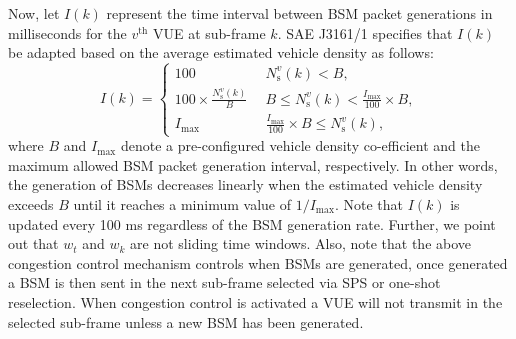 \documentclass[conference]{IEEEtran}
\begin{document}
Now, let $I(k)$ represent the time interval between BSM packet generations in milliseconds for the $v^{\mathrm{th}}$ VUE at sub-frame $k$. SAE J3161/1 specifies that $I(k)$ be adapted based on the average estimated vehicle density as follows:   
\begin{equation}
        I(k)=
        \begin{cases}
            100 & \,\,\,N_{\mathrm{s}}^{v}(k) < B,\\
            100\times\frac{{N_{\mathrm{s}}^{v}(k)}}{B} & \,\,\,B \leq{N_{\mathrm{s}}^{v}(k)}<\frac{I_{\mathrm{max}}}{100}\times{B},\\
            I_{\mathrm{max}} &\,\,\, \frac{I_{\mathrm{max}}}{100}\times{B}\leq{N_{\mathrm{s}}^{v}(k)},
        \end{cases}
\end{equation}
where $B$ and $I_{\mathrm{max}}$ denote a pre-configured vehicle density co-efficient and the maximum allowed BSM packet generation interval, respectively. In other words, the generation of BSMs decreases linearly when the estimated vehicle density exceeds $B$ until it reaches a minimum value of $1/I_{\mathrm{max}}$. Note that $I(k)$ is updated every 100 ms regardless of the BSM generation rate. Further, we point out that $w_{t}$ and $w_{k}$ are not sliding time windows. Also, note that the above congestion control mechanism controls when BSMs are generated, once generated a BSM is then sent in the next sub-frame selected via SPS or one-shot reselection.  When congestion control is activated a VUE will not transmit in the selected sub-frame unless a new BSM has been generated.


\end{document}
